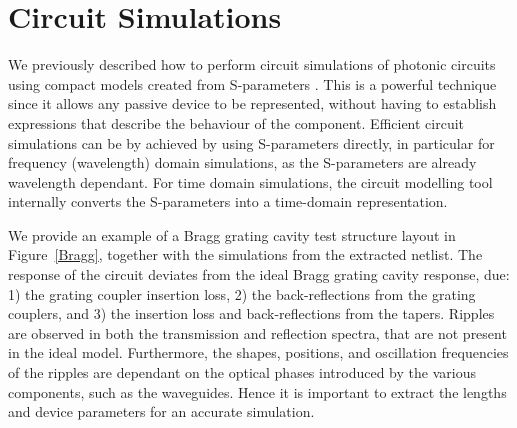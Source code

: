 \documentclass[journal]{spie}
\begin{document}
\section{Circuit Simulations}

We previously described how to perform circuit simulations of photonic circuits using compact models created from S-parameters \cite{chrostowski2014design, chrostowski2015silicon}.  This is a powerful technique since it allows any passive device to be represented, without having to establish expressions that describe the behaviour of the component.  Efficient circuit simulations can be by achieved by using S-parameters directly, in particular for frequency (wavelength) domain simulations, as the S-parameters are already wavelength dependant.  For time domain simulations, the circuit modelling tool internally converts the S-parameters into a time-domain representation.  

We provide an example of a Bragg grating cavity test structure layout in Figure~\ref{Bragg}, together with the simulations from the extracted netlist.  The response of the circuit deviates from the ideal Bragg grating cavity response, due: 1) the grating coupler insertion loss, 2) the back-reflections from the grating couplers, and 3) the insertion loss and back-reflections from the tapers.  Ripples are observed in both the transmission and reflection spectra, that are not present in the ideal model.  Furthermore, the shapes,  positions, and oscillation frequencies of the ripples are dependant on the optical phases introduced by the various components, such as the waveguides.  Hence it is important to extract the lengths and device parameters for an accurate simulation.
\end{document}
